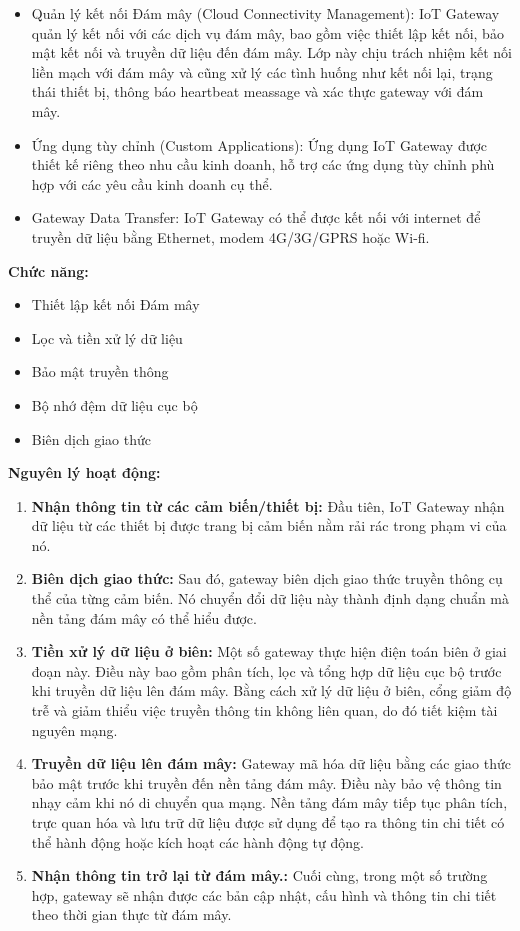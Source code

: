 \begin{itemize}
            \item Quản lý kết nối Đám mây (Cloud Connectivity Management): IoT Gateway quản lý kết nối với các dịch vụ đám mây, bao gồm việc thiết lập kết nối, bảo mật kết nối và truyền dữ liệu đến đám mây. Lớp này chịu trách nhiệm kết nối liền mạch với đám mây và cũng xử lý các tình huống như kết nối lại, trạng thái thiết bị, thông báo heartbeat meassage và xác thực gateway với đám mây.
            \item Ứng dụng tùy chỉnh (Custom Applications): Ứng dụng IoT Gateway được thiết kế riêng theo nhu cầu kinh doanh, hỗ trợ các ứng dụng tùy chỉnh phù hợp với các yêu cầu kinh doanh cụ thể.
            \item Gateway Data Transfer: IoT Gateway có thể được kết nối với internet để truyền dữ liệu bằng Ethernet, modem 4G/3G/GPRS hoặc Wi-fi.
        \end{itemize}

        \textbf{Chức năng:}
        \begin{itemize}
            \item Thiết lập kết nối Đám mây
            \item Lọc và tiền xử lý dữ liệu
            \item Bảo mật truyền thông
            \item Bộ nhớ đệm dữ liệu cục bộ
            \item Biên dịch giao thức
        \end{itemize}

        \textbf{Nguyên lý hoạt động:}
        \begin{enumerate}
            \item \textbf{Nhận thông tin từ các cảm biến/thiết bị:} Đầu tiên, IoT Gateway nhận dữ liệu từ các thiết bị được trang bị cảm biến nằm rải rác trong phạm vi của nó. 
            \item \textbf{Biên dịch giao thức:} Sau đó, gateway biên dịch giao thức truyền thông cụ thể của từng cảm biến. Nó chuyển đổi dữ liệu này thành định dạng chuẩn mà nền tảng đám mây có thể hiểu được. 
            \item \textbf{Tiền xử lý dữ liệu ở biên:} Một số gateway thực hiện điện toán biên ở giai đoạn này. Điều này bao gồm phân tích, lọc và tổng hợp dữ liệu cục bộ trước khi truyền dữ liệu lên đám mây. Bằng cách xử lý dữ liệu ở biên, cổng giảm độ trễ và giảm thiểu việc truyền thông tin không liên quan, do đó tiết kiệm tài nguyên mạng.
            \item \textbf{Truyền dữ liệu lên đám mây:} Gateway mã hóa dữ liệu bằng các giao thức bảo mật trước khi truyền đến nền tảng đám mây. Điều này bảo vệ thông tin nhạy cảm khi nó di chuyển qua mạng. Nền tảng đám mây tiếp tục phân tích, trực quan hóa và lưu trữ dữ liệu được sử dụng để tạo ra thông tin chi tiết có thể hành động hoặc kích hoạt các hành động tự động.
            \item \textbf{Nhận thông tin trở lại từ đám mây.:} Cuối cùng, trong một số trường hợp, gateway sẽ nhận được các bản cập nhật, cấu hình và thông tin chi tiết theo thời gian thực từ đám mây.
        \end{enumerate}

